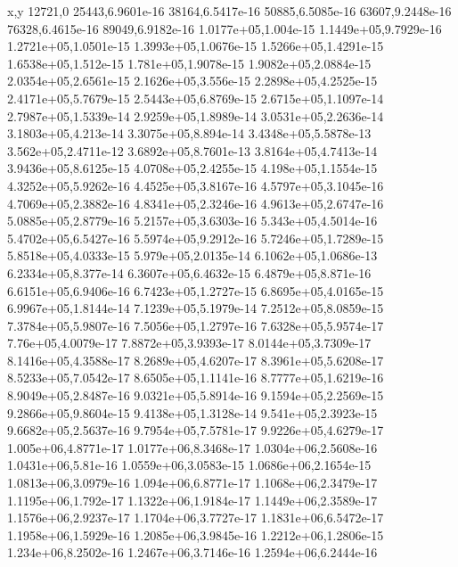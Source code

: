 x,y
12721,0
25443,6.9601e-16
38164,6.5417e-16
50885,6.5085e-16
63607,9.2448e-16
76328,6.4615e-16
89049,6.9182e-16
1.0177e+05,1.004e-15
1.1449e+05,9.7929e-16
1.2721e+05,1.0501e-15
1.3993e+05,1.0676e-15
1.5266e+05,1.4291e-15
1.6538e+05,1.512e-15
1.781e+05,1.9078e-15
1.9082e+05,2.0884e-15
2.0354e+05,2.6561e-15
2.1626e+05,3.556e-15
2.2898e+05,4.2525e-15
2.4171e+05,5.7679e-15
2.5443e+05,6.8769e-15
2.6715e+05,1.1097e-14
2.7987e+05,1.5339e-14
2.9259e+05,1.8989e-14
3.0531e+05,2.2636e-14
3.1803e+05,4.213e-14
3.3075e+05,8.894e-14
3.4348e+05,5.5878e-13
3.562e+05,2.4711e-12
3.6892e+05,8.7601e-13
3.8164e+05,4.7413e-14
3.9436e+05,8.6125e-15
4.0708e+05,2.4255e-15
4.198e+05,1.1554e-15
4.3252e+05,5.9262e-16
4.4525e+05,3.8167e-16
4.5797e+05,3.1045e-16
4.7069e+05,2.3882e-16
4.8341e+05,2.3246e-16
4.9613e+05,2.6747e-16
5.0885e+05,2.8779e-16
5.2157e+05,3.6303e-16
5.343e+05,4.5014e-16
5.4702e+05,6.5427e-16
5.5974e+05,9.2912e-16
5.7246e+05,1.7289e-15
5.8518e+05,4.0333e-15
5.979e+05,2.0135e-14
6.1062e+05,1.0686e-13
6.2334e+05,8.377e-14
6.3607e+05,6.4632e-15
6.4879e+05,8.871e-16
6.6151e+05,6.9406e-16
6.7423e+05,1.2727e-15
6.8695e+05,4.0165e-15
6.9967e+05,1.8144e-14
7.1239e+05,5.1979e-14
7.2512e+05,8.0859e-15
7.3784e+05,5.9807e-16
7.5056e+05,1.2797e-16
7.6328e+05,5.9574e-17
7.76e+05,4.0079e-17
7.8872e+05,3.9393e-17
8.0144e+05,3.7309e-17
8.1416e+05,4.3588e-17
8.2689e+05,4.6207e-17
8.3961e+05,5.6208e-17
8.5233e+05,7.0542e-17
8.6505e+05,1.1141e-16
8.7777e+05,1.6219e-16
8.9049e+05,2.8487e-16
9.0321e+05,5.8914e-16
9.1594e+05,2.2569e-15
9.2866e+05,9.8604e-15
9.4138e+05,1.3128e-14
9.541e+05,2.3923e-15
9.6682e+05,2.5637e-16
9.7954e+05,7.5781e-17
9.9226e+05,4.6279e-17
1.005e+06,4.8771e-17
1.0177e+06,8.3468e-17
1.0304e+06,2.5608e-16
1.0431e+06,5.81e-16
1.0559e+06,3.0583e-15
1.0686e+06,2.1654e-15
1.0813e+06,3.0979e-16
1.094e+06,6.8771e-17
1.1068e+06,2.3479e-17
1.1195e+06,1.792e-17
1.1322e+06,1.9184e-17
1.1449e+06,2.3589e-17
1.1576e+06,2.9237e-17
1.1704e+06,3.7727e-17
1.1831e+06,6.5472e-17
1.1958e+06,1.5929e-16
1.2085e+06,3.9845e-16
1.2212e+06,1.2806e-15
1.234e+06,8.2502e-16
1.2467e+06,3.7146e-16
1.2594e+06,6.2444e-16